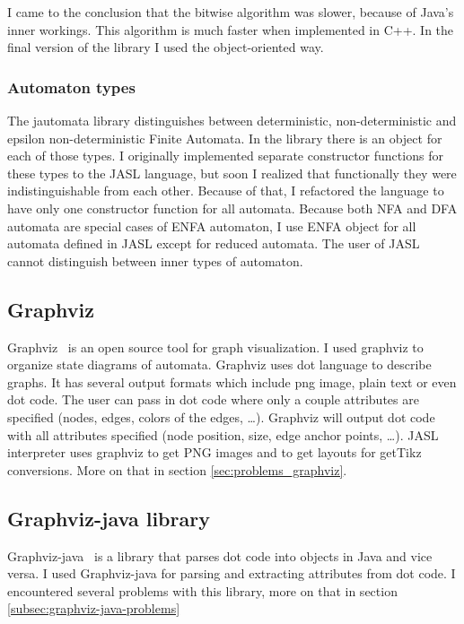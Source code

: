 \documentclass{ctuthesis}
\begin{document}
I came to the conclusion that the bitwise algorithm was slower, because of Java's inner workings. This algorithm is much faster when implemented in C++. In the final version of the library I used the object-oriented way.

\subsubsection{Automaton types}
The jautomata library distinguishes between deterministic, non-deterministic and epsilon non-deterministic Finite Automata. In the library there is an object for each of those types. I originally implemented separate constructor functions for these types to the JASL language, but soon I realized that functionally they were indistinguishable from each other. Because of that, I refactored the language to have only one constructor function for all automata. Because both NFA and DFA automata are special cases of ENFA automaton, I use ENFA object for all automata defined in JASL except for reduced automata. The user of JASL cannot distinguish between inner types of automaton.


\subsection{Graphviz}

Graphviz~\cite{graphviz} is an open source tool for graph visualization. I used graphviz to organize state diagrams of automata. Graphviz uses dot language to describe graphs. It has several output formats which include png image, plain text or even dot code. The user can pass in dot code where only a couple attributes are specified (nodes, edges, colors of the edges, \ldots). Graphviz will output dot code with all attributes specified (node position, size, edge anchor points, \ldots).  JASL interpreter uses graphviz to get PNG images and to get layouts for getTikz conversions. More on that in section \ref{sec:problems_graphviz}.

\subsection{Graphviz-java library}
Graphviz-java~\cite{graphviz-java} is a library that parses dot code into objects in Java and vice versa. I used Graphviz-java for parsing and extracting attributes from dot code. I encountered several problems with this library, more on that in section \ref{subsec:graphviz-java-problems}
\end{document}
